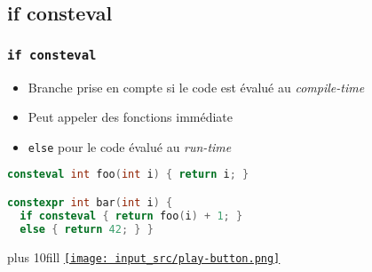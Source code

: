 \documentclass[C++.tex]{subfiles}
\begin{document}
\subsection*{if consteval}
\begin{frame}[fragile]
	\frametitle{\lstinline|if consteval|}
	\begin{itemize}
		\item Branche prise en compte si le code est évalué au \textit{compile-time}
		\item Peut appeler des fonctions immédiate


		\item \lstinline|else| pour le code évalué au \textit{run-time}
	\end{itemize}

	\begin{lstlisting}[language=C++]
consteval int foo(int i) { return i; }

constexpr int bar(int i) {
  if consteval { return foo(i) + 1; } 
  else { return 42; } }\end{lstlisting}

	\vskip 10mm plus 10fill
	\hfill
	\href{https://godbolt.org/#g:!((g:!((g:!((h:codeEditor,i:(filename:'1',fontScale:14,fontUsePx:'0',j:1,lang:c%2B%2B,selection:(endColumn:1,endLineNumber:27,positionColumn:1,positionLineNumber:27,selectionStartColumn:1,selectionStartLineNumber:1,startColumn:1,startLineNumber:1),source:'%23include+%3Ciostream%3E%0A%0Aconsteval+int+foo(int+i)%0A%7B%0A++return+i%3B%0A%7D%0A%0Aconstexpr+int+bar(int+i)%0A%7B%0A++if+consteval%0A++%7B%0A++++return+foo(i)+%2B+1%3B%0A++%7D%0A++else%0A++%7B%0A++++return+42%3B%0A++%7D%0A%7D%0A%0Aint+main()%0A%7B%0A++std::cout+%3C%3C+bar(5)+%3C%3C+%22%5Cn%22%3B%0A%0A++constexpr+int+baz+%3D+bar(10)%3B%0A++std::cout+%3C%3C+baz+%3C%3C+%22%5Cn%22%3B%0A%7D%0A'),l:'5',n:'0',o:'C%2B%2B+source+%231',t:'0')),k:50,l:'4',n:'0',o:'',s:0,t:'0'),(g:!((h:executor,i:(argsPanelShown:'1',compilationPanelShown:'0',compiler:g122,compilerName:'',compilerOutShown:'0',execArgs:'',execStdin:'',fontScale:14,fontUsePx:'0',j:1,lang:c%2B%2B,libs:!((name:boost,ver:'175')),options:'-std%3Dc%2B%2B23+-Wall+-Wextra+-pedantic',source:1,stdinPanelShown:'1',tree:'1',wrap:'0'),l:'5',n:'0',o:'Executor+x86-64+gcc+12.2+(C%2B%2B,+Editor+%231)',t:'0')),header:(),k:50,l:'4',n:'0',o:'',s:0,t:'0')),l:'2',n:'0',o:'',t:'0')),version:4}{\texttt{[image: input\_src/play-button.png]}}
\end{frame}
\end{document}
